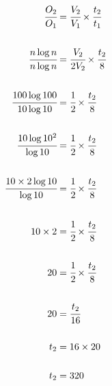 \documentclass[12pt]{article}
\begin{document}
\begin{align*}
\cfrac{O_{2}}{O_{1}} &= \cfrac{V_{2}}{V_{1}} \times \cfrac{t_{2}}{t_{1}} \\ \\
\cfrac{n\log{n}}{n\log{n}} &= \cfrac{V_{2}}{2V_{2}} \times \cfrac{t_{2}}{8} \\ \\
\cfrac{100\log{100}}{10\log{10}} &= \cfrac{1}{2} \times \cfrac{t_{2}}{8} \\ \\
\cfrac{10\log{10^{2}}}{\log{10}} &= \cfrac{1}{2} \times \cfrac{t_{2}}{8} \\ \\
\cfrac{10 \times 2 \log{10}}{\log{10}} &= \cfrac{1}{2} \times \cfrac{t_{2}}{8} \\ \\
10 \times 2 &= \cfrac{1}{2} \times \cfrac{t_{2}}{8} \\ \\
20 &= \cfrac{1}{2} \times \cfrac{t_{2}}{8} \\ \\
20 &= \cfrac{t_{2}}{16} \\ \\
t_{2} &= 16 \times 20 \\ \\
t_{2} &= 320 \\ \\
\end{align*}
\end{document}
